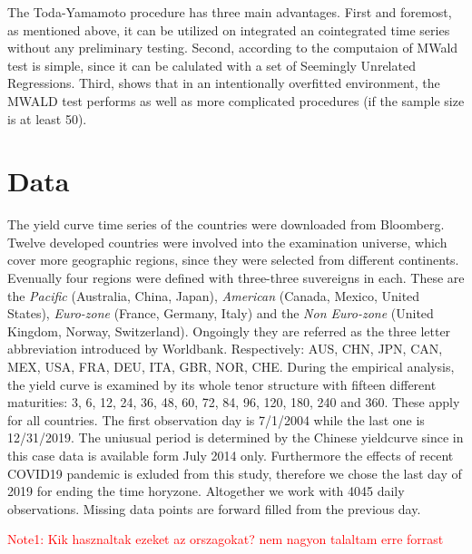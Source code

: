 \documentclass[12pt,bibliography=totoc]{article}
\begin{document}
{The Toda-Yamamoto procedure  has  three main advantages.  First and foremost, as mentioned above, it can be utilized on integrated an cointegrated time series without any preliminary testing. Second, according to \cite{rambaldi1996testing} the computaion of MWald test is simple, since it can be calulated with a set of Seemingly  Unrelated  Regressions. Third, \cite{zapata1997monte} shows that in an intentionally overfitted environment, the MWALD test performs as well as more complicated procedures (if the sample size is at least 50).




\newpage 



\section{Data}

The yield curve time series of the countries were downloaded from Bloomberg. Twelve developed countries were involved into the examination universe, which cover more geographic regions, since they were selected from different continents. Evenually four regions were defined with three-three suvereigns in each. These are the \textit{Pacific} (Australia, China, Japan), \textit{American} (Canada, Mexico, United States), \textit{Euro-zone} (France, Germany, Italy) and the \textit{Non Euro-zone} (United Kingdom, Norway, Switzerland). Ongoingly they are referred as the three letter abbreviation introduced by Worldbank. Respectively:  AUS, CHN, JPN, CAN, MEX, USA, FRA, DEU, ITA, GBR, NOR, CHE. During the empirical analysis, the yield curve is examined by its whole tenor structure with fifteen different maturities: 3, 6, 12, 24, 36, 48, 60, 72, 84, 96, 120, 180, 240 and 360. These apply for all countries. The first observation day is 7/1/2004 while the last one is 12/31/2019. The uniusual period is determined by the Chinese yieldcurve since in this case data is available form July 2014 only. Furthermore the effects of recent COVID19 pandemic is exluded from this study, therefore we chose the last day of 2019 for ending the time horyzone. Altogether we work with 4045 daily observations. Missing data points are forward filled from the previous day.

\textcolor{red}{Note1: Kik hasznaltak ezeket az orszagokat? nem nagyon talaltam erre forrast}

}
\end{document}
